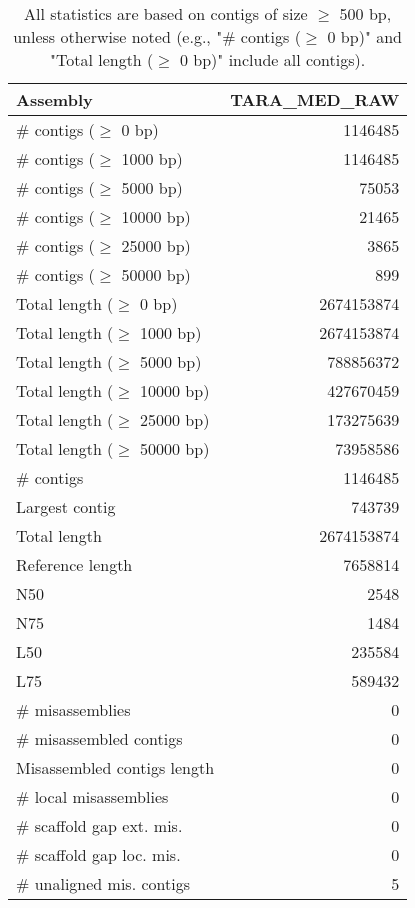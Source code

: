 \documentclass[12pt,a4paper]{article}
\begin{document}
\begin{table}[ht]
\begin{center}
\caption{All statistics are based on contigs of size $\geq$ 500 bp, unless otherwise noted (e.g., "\# contigs ($\geq$ 0 bp)" and "Total length ($\geq$ 0 bp)" include all contigs).}
\begin{tabular}{|l*{1}{|r}|}
\hline
Assembly & TARA\_MED\_RAW \\ \hline
\# contigs ($\geq$ 0 bp) & 1146485 \\ \hline
\# contigs ($\geq$ 1000 bp) & 1146485 \\ \hline
\# contigs ($\geq$ 5000 bp) & 75053 \\ \hline
\# contigs ($\geq$ 10000 bp) & 21465 \\ \hline
\# contigs ($\geq$ 25000 bp) & 3865 \\ \hline
\# contigs ($\geq$ 50000 bp) & 899 \\ \hline
Total length ($\geq$ 0 bp) & 2674153874 \\ \hline
Total length ($\geq$ 1000 bp) & 2674153874 \\ \hline
Total length ($\geq$ 5000 bp) & 788856372 \\ \hline
Total length ($\geq$ 10000 bp) & 427670459 \\ \hline
Total length ($\geq$ 25000 bp) & 173275639 \\ \hline
Total length ($\geq$ 50000 bp) & 73958586 \\ \hline
\# contigs & 1146485 \\ \hline
Largest contig & 743739 \\ \hline
Total length & 2674153874 \\ \hline
Reference length & 7658814 \\ \hline
N50 & 2548 \\ \hline
N75 & 1484 \\ \hline
L50 & 235584 \\ \hline
L75 & 589432 \\ \hline
\# misassemblies & 0 \\ \hline
\# misassembled contigs & 0 \\ \hline
Misassembled contigs length & 0 \\ \hline
\# local misassemblies & 0 \\ \hline
\# scaffold gap ext. mis. & 0 \\ \hline
\# scaffold gap loc. mis. & 0 \\ \hline
\# unaligned mis. contigs & 5 \\ \hline

\end{tabular}
\end{center}
\end{table}
\end{document}
